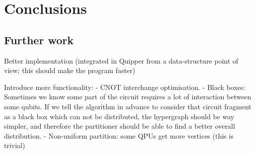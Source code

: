 \chapter{Conclusions}
\label{chap:Conclusions}

\section{Further work}


Better implementation (integrated in Quipper from a data-structure point of view; this should make the program faster)

Introduce more functionality:
  - CNOT interchange optimisation.
  - Black boxes: Sometimes we know some part of the circuit requires a lot of interaction between some qubits. If we tell the algorithm in advance to consider that circuit fragment as a black box which can not be distributed, the hypergraph should be way simpler, and therefore the partitioner should be able to find a better overall distribution.
  - Non-uniform partition: some QPUs get more vertices (this is trivial)